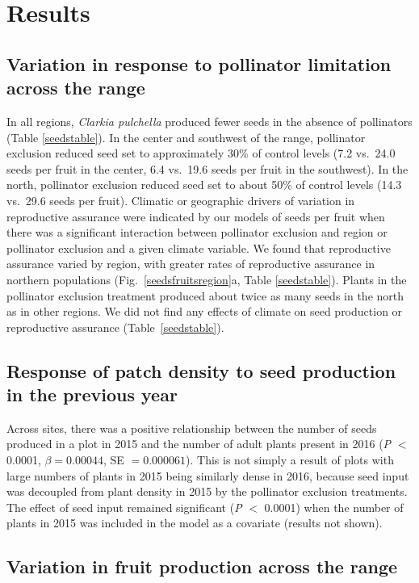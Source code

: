 \documentclass{article}
\begin{document}
\section*{Results}

\subsection*{Variation in response to pollinator limitation across the range}

In all regions, \textit{Clarkia pulchella} produced fewer seeds in the absence of pollinators (Table \ref{seedstable}). In the center and southwest of the range, pollinator exclusion reduced seed set to approximately 30\% of control levels (7.2 vs.\ 24.0 seeds per fruit in the center, 6.4 vs.\ 19.6 seeds per fruit in the southwest). In the north, pollinator exclusion reduced seed set to about 50\% of control levels (14.3 vs.\ 29.6 seeds per fruit). Climatic or geographic drivers of variation in reproductive assurance were indicated by our models of seeds per fruit when there was a significant interaction between pollinator exclusion and region or pollinator exclusion and a given climate variable. We found that reproductive assurance varied by region, with greater rates of reproductive assurance in northern populations (Fig.\ \ref{seedsfruitsregion}a, Table \ref{seedstable}). Plants in the pollinator exclusion treatment produced about twice as many seeds in the north as in other regions. We did not find any effects of climate on seed production or reproductive assurance (Table\ \ref{seedstable}).


\subsection*{Response of patch density to seed production in the previous year}

Across sites, there was a positive relationship between the number of seeds produced in a plot in 2015 and the number of adult plants present in 2016 (\textit{P} $<$ 0.0001, $\beta = 0.00044$, SE $=0.000061$). This is not simply a result of plots with large numbers of plants in 2015 being similarly dense in 2016, because seed input was decoupled from plant density in 2015 by the pollinator exclusion treatments. The effect of seed input remained significant (\textit{P} $<$ 0.0001) when the number of plants in 2015 was included in the model as a covariate (results not shown). 

\subsection*{Variation in fruit production across the range}
\end{document}
